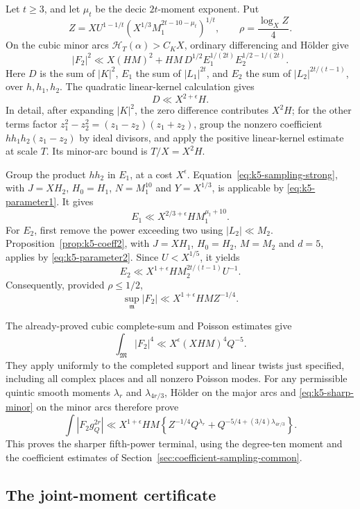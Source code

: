 \documentclass[11pt]{amsart}
\theoremstyle{definition}
\numberwithin{equation}{section}
\begin{document}
Let $t\ge3$, and let $\mu_t$ be the decic $2t$-moment exponent.  Put
\[
 Z=XU^{1-1/t}\left(X^{1/3}M_1^{2t-10-\mu_t}\right)^{1/t},
 \qquad \rho=\frac{\log_X Z}{4}.
\]
On the cubic minor arcs $\mathcal H_T(\alpha)>C_KX$, ordinary differencing
and H\"older give
\[
 |F_2|^2\ll X(HM)^2+HM\,D^{1/2}E_1^{1/(2t)}E_2^{1/2-1/(2t)}.
\]
Here $D$ is the sum of $|K|^2$, $E_1$ the sum of $|L_1|^{2t}$, and
$E_2$ the sum of $|L_2|^{2t/(t-1)}$, over $h,h_1,h_2$.
The quadratic linear-kernel calculation gives
\[
 D\ll X^{2+\epsilon}H.
\]
In detail, after expanding $|K|^2$, the zero difference contributes $X^2H$;
for the other terms factor $z_1^2-z_2^2=(z_1-z_2)(z_1+z_2)$, group the
nonzero coefficient $hh_1h_2(z_1-z_2)$ by ideal divisors, and apply the
positive linear-kernel estimate at scale $T$.  Its minor-arc bound is
$T/X=X^2H$.

Group the product $hh_2$ in $E_1$, at a cost $X^\epsilon$.
Equation~\eqref{eq:k5-sampling-strong}, with
$J=XH_2$, $H_0=H_1$, $N=M_1^{10}$ and $Y=X^{1/3}$, is applicable by
\eqref{eq:k5-parameter1}.  It gives
\[
 E_1\ll X^{2/3+\epsilon}H M_1^{\mu_t+10}.
\]
For $E_2$, first remove the power exceeding two using $|L_2|\ll M_2$.
Proposition~\ref{prop:k5-coeff2}, with $J=XH_1$, $H_0=H_2$, $M=M_2$ and
$d=5$, applies by \eqref{eq:k5-parameter2}.  Since $U<X^{1/5}$, it yields
\[
 E_2\ll X^{1+\epsilon}H M_2^{2t/(t-1)}U^{-1}.
\]
Consequently, provided $\rho\le1/2$,
\begin{equation}\label{eq:k5-sharp-minor}
 \sup_{\mathfrak m}|F_2|\ll X^{1+\epsilon}HM Z^{-1/4}.
\end{equation}

The already-proved cubic complete-sum and Poisson estimates give
\[
 \int_{\mathfrak M}|F_2|^4\ll X^\epsilon(XHM)^4Q^{-5}.
\]
They apply uniformly to the completed support and linear twists just
specified, including all complex places and all nonzero Poisson modes.
For any permissible quintic smooth moments $\lambda_r$ and
$\lambda_{4r/3}$, H\"older on the major arcs and
\eqref{eq:k5-sharp-minor} on the minor arcs therefore prove
\begin{equation}\label{eq:k5-enhanced-terminal}
 \int|F_2g_Q^{2r}|
 \ll X^{1+\epsilon}HM
 \left\{Z^{-1/4}Q^{\lambda_r}
       +Q^{-5/4+(3/4)\lambda_{4r/3}}\right\}.
\end{equation}
This proves the sharper fifth-power terminal, using the degree-ten
moment and the coefficient estimates of Section~\ref{sec:coefficient-sampling-common}.


\subsection{The joint-moment certificate}
\label{sec:k5-certificate}
\end{document}
